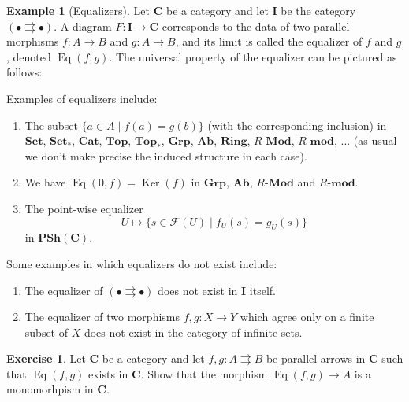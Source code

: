 \documentclass[12pt,reqno,a4paper]{amsart}
\theoremstyle{plain}
\theoremstyle{definition}
\newtheorem{exmp}[thm]{Example}
\newtheorem{xca}[thm]{Exercise}
\theoremstyle{remark}
\begin{document}
\begin{exmp}[Equalizers]
  Let $\mathbf{C}$ be a category and let $\mathbf{I}$ be the category $(\bullet \rightrightarrows \bullet)$.
  A diagram $F \colon \mathbf{I} \to \mathbf{C}$ corresponds to the data of two parallel morphisms $f \colon A \to B$ and $g \colon A \to B$, and its limit is called the equalizer of $f$ and $g$, denoted $\operatorname{Eq}(f,g)$.
  The universal property of the equalizer can be pictured as follows:
  \begin{center}
  \end{center}
  Examples of equalizers include:
  \begin{enumerate}
    \item The subset $\{ a \in A \mid f(a) = g(b) \}$ (with the corresponding inclusion) in $\mathbf{Set}$, $\mathbf{Set}_{*}$, $\mathbf{Cat}$, $\mathbf{Top}$, $\mathbf{Top}_{*}$, $\mathbf{Grp}$, $\mathbf{Ab}$, $\mathbf{Ring}$, $R$-$\mathbf{Mod}$, $R$-$\mathbf{mod}$, ... (as usual we don't make precise the induced structure in each case).
    \item We have $\operatorname{Eq}(0,f) = \operatorname{Ker}(f)$ in $\mathbf{Grp}$, $\mathbf{Ab}$, $R$-$\mathbf{Mod}$ and $R$-$\mathbf{mod}$.
    \item The point-wise equalizer
      \[ U \mapsto \{ s \in \mathscr{F}(U) \mid f_{U}(s) = g_{U}(s) \} \]
      in $\mathbf{PSh}(\mathbf{C})$.
  \end{enumerate}
  Some examples in which equalizers do not exist include:
  \begin{enumerate} 
    \item The equalizer of $(\bullet \rightrightarrows \bullet)$ does not exist in $\mathbf{I}$ itself.
    \item The equalizer of two morphisms $f, g \colon X \to Y$ which agree only on a finite subset of $X$ does not exist in the category of infinite sets.
  \end{enumerate}
\end{exmp}

\begin{xca}
  Let $\mathbf{C}$ be a category and let $f, g \colon A \rightrightarrows B$ be parallel arrows in $\mathbf{C}$ such that $\operatorname{Eq}(f,g)$ exists in $\mathbf{C}$.
  Show that the morphism $\operatorname{Eq}(f,g) \to A$ is a monomorhpism in $\mathbf{C}$.
\end{xca}
\end{document}
